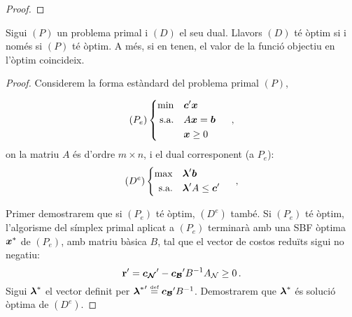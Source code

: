 \begin{col}
\begin{proof}
	\end{proof}
\end{col}

\begin{teo}\label{teo:dualitat-fort}
	Sigui $\left(P\right)$ un problema primal i $\left(D\right)$ el seu dual.
	Llavors $(D)$ té òptim si i només si $(P)$ té òptim. A més, si en tenen, el
	valor de la funció objectiu en l'òptim coincideix.
	\begin{proof}
		Considerem la forma estàndard del problema primal $(P)$,
		
		\[
		(P_e)
		\begin{cases}
		\begin{aligned}
		\min 			&&& \boldsymbol{c}'\boldsymbol{x}\\
		\text{s.a.}		&&& A\boldsymbol{x} = \boldsymbol{b}\\
		&&& \boldsymbol{x}\ge0
		\end{aligned}
		\end{cases}\ ,
		\]
		on la matriu $A$ és d'ordre $m\times n$, i el dual corresponent (a 
		$P_e$):
		\[
		(D^e)
		\begin{cases}
		\begin{aligned}
		\max 			&&& \boldsymbol{\lambda}'\boldsymbol{b}\\
		\text{s.a.}		&&& \boldsymbol{\lambda}'A \le \boldsymbol{c}'
		\end{aligned}
		\end{cases}\ ,
		\]
		
		Primer demostrarem que si $(P_e)$ té òptim, $(D^e)$ també. Si $(P_e)$ té
		òptim, l'algorisme del símplex primal aplicat a $(P_e)$ terminarà amb 
		una SBF
		òptima $^\ast$ de $(P_e)$, amb matriu bàsica $B$, tal que el 
		vector de
		costos reduïts sigui no negatiu: \[\mathbf{r}' = \boldsymbol{c_{\mathcal{N}}} '- 
		\boldsymbol{c_{\mathcal{B}}}' B^{-1}
		A_{\mathcal{N}} \ge 0\,.\] Sigui $\boldsymbol{\lambda}^\ast$ el vector definit per
		${\vb{\lambda}^\ast}' {}'B^{-1}$. Demostrarem que
		$\boldsymbol{\lambda}^\ast$ és solució òptima de $(D^e)$.
		

\end{proof}
\end{teo}
